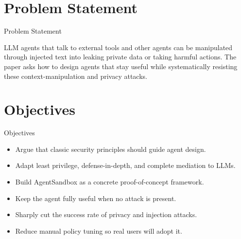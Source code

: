 \documentclass[10pt]{beamer}
\begin{document}
\section{Problem Statement}
\begin{frame}{Problem Statement}
  \begin{block}{}
  LLM agents that talk to external tools and other agents can be manipulated through injected text into leaking private data or taking harmful actions. The paper asks how to design agents that stay useful while systematically resisting these context-manipulation and privacy attacks.
  \end{block}
\end{frame}
\section{Objectives}
\begin{frame}{Objectives}
\begin{itemize}
  \item Argue that classic security principles should guide agent design.
  \item Adapt least privilege, defense-in-depth, and complete mediation to LLMs.
  \item Build AgentSandbox as a concrete proof-of-concept framework.
  \item Keep the agent fully useful when no attack is present.
  \item Sharply cut the success rate of privacy and injection attacks.
  \item Reduce manual policy tuning so real users will adopt it.
\end{itemize}
\end{frame}
\end{document}
